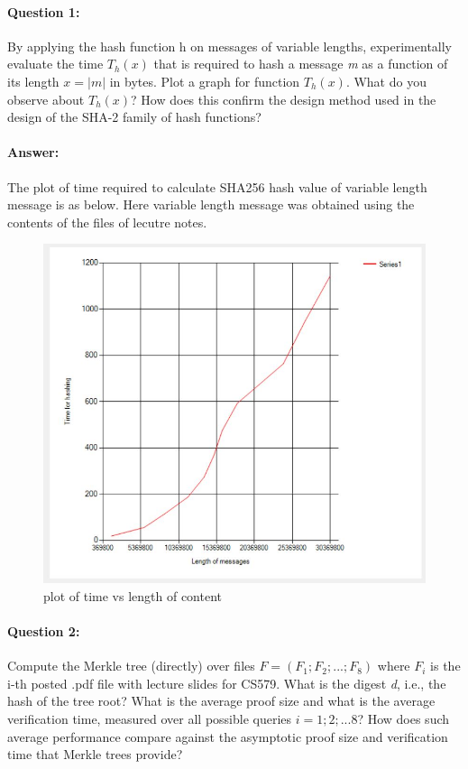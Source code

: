 \documentclass{article}
\begin{document}
    \paragraph{Question 1:} By applying the hash function h on messages of variable lengths, experimentally evaluate the time $T_h(x)$ that is required to hash a message \emph{m} as a function of its length $x = |m|$ in bytes. Plot a graph for function $T_h(x)$. What do you observe about $T_h(x)$? How does this confirm the design method used in the design of the SHA-2 family of hash functions?
    \paragraph{Answer:\newline}
        The plot of time required to calculate SHA256 hash value of variable length message is as below. Here variable length message was obtained using the contents of the files of lecutre notes.
        
        \begin{figure}[H]
            \centering
            \includegraphics[scale=0.4]{S4Q1}
            \caption{plot of time vs length of content}
            \label{fig:SHA256 timing vs content length}
        \end{figure}
        
    \paragraph{Question 2:} Compute the Merkle tree (directly) over files $F = (F_1; F_2; . . . ; F_8)$ where $F_i$ is the i-th posted .pdf file with lecture slides for CS579. What is the digest \emph{d}, i.e., the hash of the tree root? What is the average proof size and what is the average verification time, measured over all possible queries $i = 1; 2; . . . 8$? How does such average performance compare against the asymptotic proof size and verification time that Merkle trees provide?    
\end{document}
